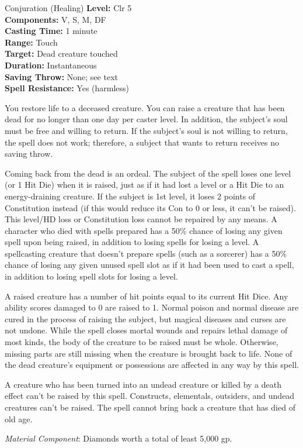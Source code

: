 {Conjuration (Healing)}
{
	\textbf{Level:}
	Clr 5\\
	\textbf{Components:}
	V, S, M, DF\\
	\textbf{Casting Time:}
	1 minute\\
	\textbf{Range:}
	Touch\\
	\textbf{Target:}
	Dead creature touched\\
	\textbf{Duration:}
	Instantaneous\\
	\textbf{Saving Throw:}
	None; see text\\
	\textbf{Spell Resistance:}
	Yes (harmless)\\
}
{
	You restore life to a deceased creature. You can raise a creature that has been dead for no longer than one day per caster level. In addition, the subject's soul must be free and willing to return. If the subject's soul is not willing to return, the spell does not work; therefore, a subject that wants to return receives no saving throw.

	Coming back from the dead is an ordeal. The subject of the spell loses one level (or 1 Hit Die) when it is raised, just as if it had lost a level or a Hit Die to an energy-draining creature. If the subject is 1st level, it loses 2 points of Constitution instead (if this would reduce its Con to 0 or less, it can't be raised). This level/HD loss or Constitution loss cannot be repaired by any means. A character who died with spells prepared has a 50\% chance of losing any given spell upon being raised, in addition to losing spells for losing a level. A spellcasting creature that doesn't prepare spells (such as a sorcerer) has a 50\% chance of losing any given unused spell slot as if it had been used to cast a spell, in addition to losing spell slots for losing a level.

	A raised creature has a number of hit points equal to its current Hit Dice. Any ability scores damaged to 0 are raised to 1. Normal poison and normal disease are cured in the process of raising the subject, but magical diseases and curses are not undone. While the spell closes mortal wounds and repairs lethal damage of most kinds, the body of the creature to be raised must be whole. Otherwise, missing parts are still missing when the creature is brought back to life. None of the dead creature's equipment or possessions are affected in any way by this spell.

	A creature who has been turned into an undead creature or killed by a death effect can't be raised by this spell. Constructs, elementals, outsiders, and undead creatures can't be raised. The spell cannot bring back a creature that has died of old age.

	\textit{Material Component}:
	Diamonds worth a total of least 5,000 gp.

}
